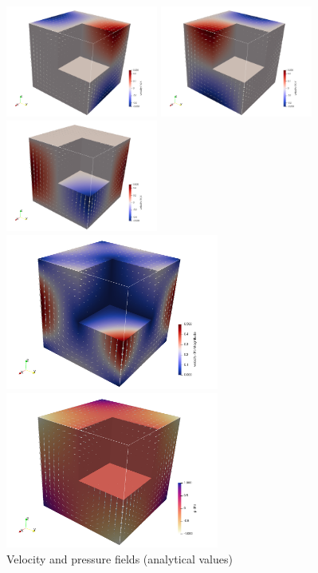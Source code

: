 \begin{center}
\includegraphics[width=5cm]{python_codes/fieldstone_75/results/mms3D/u}
\includegraphics[width=5cm]{python_codes/fieldstone_75/results/mms3D/v}
\includegraphics[width=5cm]{python_codes/fieldstone_75/results/mms3D/w}\\
\includegraphics[width=7cm]{python_codes/fieldstone_75/results/mms3D/vel}
\includegraphics[width=7cm]{python_codes/fieldstone_75/results/mms3D/p}\\
{\captionfont Velocity and pressure fields (analytical values)}
\end{center}

